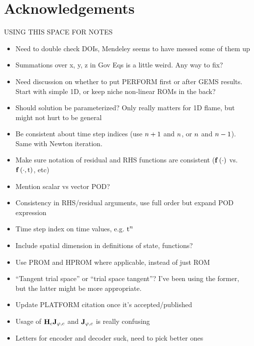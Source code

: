 \chapter{Acknowledgements}

{\color{red}
USING THIS SPACE FOR NOTES
\begin{itemize}
	\item Need to double check DOIs, Mendeley seems to have messed some of them up
	\item Summations over x, y, z in Gov Eqs is a little weird. Any way to fix?
	\item Need discussion on whether to put PERFORM first or after GEMS results. Start with simple 1D, or keep niche non-linear ROMs in the back?
	\item Should solution be parameterized? Only really matters for 1D flame, but might not hurt to be general
	\item Be consistent about time step indices (use $n + 1$ and $n$, or $n$ and $n - 1$). Same with Newton iteration.
	\item Make sure notation of residual and RHS functions are consistent ($\mathbf{f} \left(\cdot\right)$ vs. $\mathbf{f} \left(\cdot, \text{t}\right)$, etc)
	\item Mention scalar vs vector POD?
	\item Consistency in RHS/residual arguments, use full order but expand POD expression
	\item Time step index on time values, e.g. $\text{t}^{n}$
	\item Include spatial dimension in definitions of state, functions?
	\item Use PROM and HPROM where applicable, instead of just ROM
	\item ``Tangent trial space'' or ``trial space tangent''? I've been using the former, but the latter might be more appropriate.
	\item Update PLATFORM citation once it's accepted/published
	\item Usage of $\jacobDecodeCons$ and $\mathbf{J}_{\varphi,c}$ is really confusing
	\item Letters for encoder and decoder suck, need to pick better ones
\end{itemize}

}